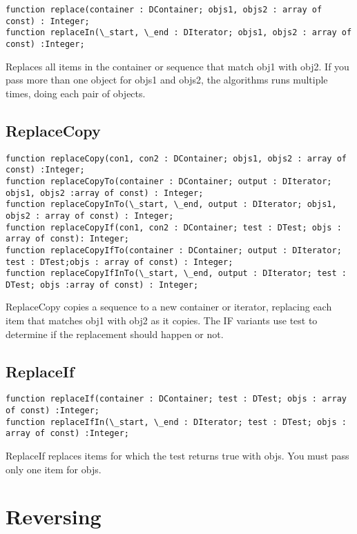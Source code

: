 \documentclass{report}
\begin{document}
\begin{lstlisting}
function replace(container : DContainer; objs1, objs2 : array of const) : Integer;
function replaceIn(\_start, \_end : DIterator; objs1, objs2 : array of const) :Integer;
\end{lstlisting}

Replaces all items in the container or sequence that match obj1 with obj2.
If you pass more than one object for objs1 and objs2, the algorithms runs
multiple times, doing each pair of objects.

\subsection{ReplaceCopy}

\begin{lstlisting}
function replaceCopy(con1, con2 : DContainer; objs1, objs2 : array of const) :Integer;
function replaceCopyTo(container : DContainer; output : DIterator; objs1, objs2 :array of const) : Integer;
function replaceCopyInTo(\_start, \_end, output : DIterator; objs1, objs2 : array of const) : Integer;
function replaceCopyIf(con1, con2 : DContainer; test : DTest; objs : array of const): Integer;
function replaceCopyIfTo(container : DContainer; output : DIterator; test : DTest;objs : array of const) : Integer;
function replaceCopyIfInTo(\_start, \_end, output : DIterator; test : DTest; objs :array of const) : Integer;
\end{lstlisting}

ReplaceCopy copies a sequence to a new container or iterator, replacing each
item that matches obj1 with obj2 as it copies. The IF variants use test to
determine if the replacement should happen or not.

\subsection{ReplaceIf}

\begin{lstlisting}
function replaceIf(container : DContainer; test : DTest; objs : array of const) :Integer;
function replaceIfIn(\_start, \_end : DIterator; test : DTest; objs : array of const) :Integer;
\end{lstlisting}

ReplaceIf replaces items for which the test returns true with objs. You must
pass only one item for objs.

\section{Reversing}
\end{document}
